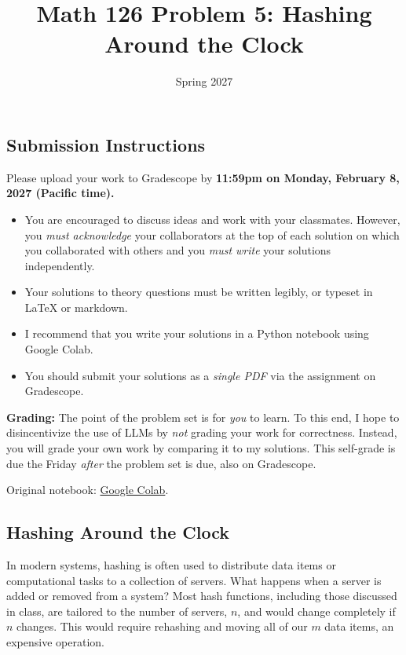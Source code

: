 \documentclass{article}
\title{Math 126 Problem 5: Hashing Around the Clock}
\author{} %
\date{Spring 2027}
\begin{document}
\maketitle

\hypertarget{submission-instructions}{%
\subsection*{Submission Instructions}\label{submission-instructions}}

Please upload your work to Gradescope by \textbf{11:59pm on Monday, February 8, 2027 (Pacific time).}

\begin{itemize}
\item
  You are encouraged to discuss ideas and work with your classmates. However, you \emph{must acknowledge} your collaborators at the top of each solution on which you collaborated with others and you \emph{must write} your solutions independently.
\item
  Your solutions to theory questions must be written legibly, or typeset in LaTeX or markdown.
\item
  I recommend that you write your solutions in a Python notebook using Google Colab.
\item
  You should submit your solutions as a \emph{single PDF} via the assignment on Gradescope.
\end{itemize}

\textbf{Grading:} The point of the problem set is for \emph{you} to learn. To this end, I hope to disincentivize the use of LLMs by \emph{not} grading your work for correctness. Instead, you will grade your own work by comparing it to my solutions. This self-grade is due the Friday \emph{after} the problem set is due, also on Gradescope.

\noindent Original notebook: \href{https://colab.research.google.com/drive/1LuRvgAY3ruIoxXY4w99kkiT-8luiVyo9?usp=sharing}{Google Colab}.

\hypertarget{hashing-around-the-clock}{%
\subsection*{Hashing Around the Clock}\label{hashing-around-the-clock}}

In modern systems, hashing is often used to distribute data items or computational tasks to a collection of servers. What happens when a server is added or removed from a system? Most hash functions, including those discussed in class, are tailored to the number of servers, \(n\), and would change completely if \(n\) changes. This would require rehashing and moving all of our \(m\) data items, an expensive operation.
\end{document}
